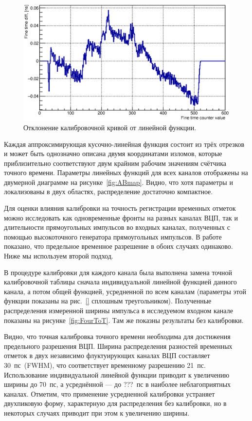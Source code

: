 \begin{figure}
\includegraphics[width=1.0\textwidth]{pictures/CalTableMinusFit_0010_01.eps}
\caption{Отклонение калибровочной кривой от линейной функции.}
\label{fig:CalibTableMinusFit}
\end{figure}

Каждая аппроксимирующая кусочно-линейная функция состоит из трёх отрезков и может быть однозначно описана двумя координатами изломов, которые приблизительно соответствуют двум крайним рабочим значениям счётчика точного времени. Параметры линейных функций для всех каналов отображены на двумерной диаграмме на рисунке~\ref{fig:ABmap}. Видно, что хотя параметры и локализованы в двух областях, распределение достаточно компактное.

Для оценки влияния калибровки на точность регистрации временных отметок можно исследовать как одновременные фронты на разных каналах ВЦП, так и длительности прямоугольных импульсов во входных каналах, полученных с помощью высокоточного генератора прямоугольных импульсов. В работе~\cite{PEPAN} показано, что предельное временное разрешение в обоих случаях одинаково. Ниже мы используем второй подход.

В процедуре калибровки для каждого канала была выполнена замена точной калибровочной таблицы сначала индивидуальной линейной функцией данного канала, а потом общей функцией, усредненной по всем каналам (параметры этой функции показаны на рис.~\ref{} сплошным треугольником). Полученные распределения измеренной ширины импульса в исследуемом входном канале показаны на рисунке~\ref{fig:FourToT}. Там же показны результаты без калибровки.

Видно, что точная калибровка точного времени необходима для достижения предельного разрешения ВЦП. Ширина распределения разностей временных отметок в двух независимо флуктуирующих каналах ВЦП составляет 30~пс~(FWHM), что соответствует временному разрешению 21~пс. Использование индивидуальной линейной функции приводит к увеличению ширины до 70~пс, а усреднённой --- до ???~пс в наиболее неблагоприятных каналах. Отметим, что применение усредненной калибровки устраняет двухпиковую форму, характерную для распределения без калибровки, но в некоторых случаях приводит при этом к увеличению ширины.

